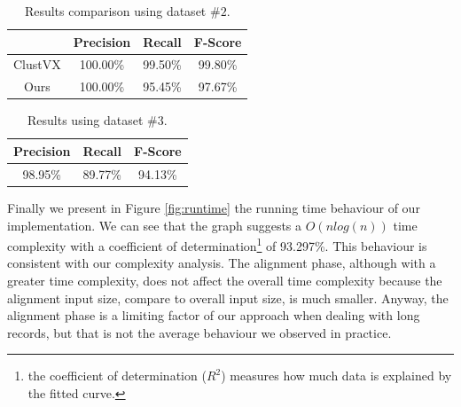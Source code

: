 \documentclass{vldb}
\begin{document}
\begin{table}[h]
\centering
\caption{Results comparison using dataset $\#2$.}
\label{table:compare2}
\begin{tabular}
{|c| c| c| c|}\hline
	& Precision	& Recall	& F-Score\\ \hline
ClustVX\cite{grigalis2013towards} &	100.00\% & 99.50\% & 99.80\%\\ \hline
Ours &	100.00\% & 95.45\% & 97.67\% \\ \hline
\end{tabular}
\end{table}

\begin{table}[h]
\centering
\caption{Results using dataset $\#3$.}
\label{table:compare3}
\begin{tabular}
{| c| c| c|}\hline
	Precision	& Recall	& F-Score\\ \hline
	98.95\% & 89.77\% & 94.13\% \\ \hline
\end{tabular}
\end{table}

Finally we present in Figure \ref{fig:runtime} the running time behaviour of our
implementation. We can see that the graph suggests a $O(nlog(n))$ time
complexity with a coefficient of determination\footnote{the coefficient of
determination ($R^2$) measures how much data is explained by the fitted curve.}
of 93.297\%. This behaviour is consistent with our complexity analysis. The
alignment phase, although with a greater time complexity, does not affect the
overall time complexity because the alignment input size, compare to overall
input size, is much smaller. Anyway, the alignment phase is a limiting
factor of our approach when dealing with long records, but that is not the
average behaviour we observed in practice.
\end{document}
